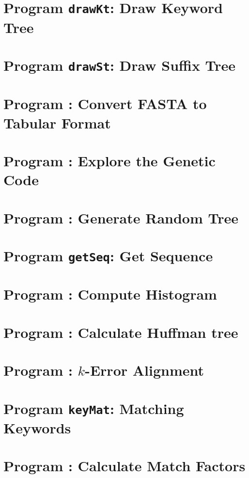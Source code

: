 \documentclass[a4paper]{report}
\begin{document}
\chapter{Program \texttt{drawKt}: Draw Keyword Tree}\label{ch:dkt}

\chapter{Program \texttt{drawSt}: Draw Suffix Tree}\label{ch:dst}

\chapter{Program : Convert FASTA to Tabular
  Format}\label{ch:f2t}

\chapter{Program : Explore the Genetic Code}\label{ch:gc}

\chapter{Program : Generate Random Tree}\label{ch:gt}

\chapter{Program \texttt{getSeq}: Get Sequence}\label{ch:get}

\chapter{Program : Compute Histogram}\label{ch:his}

\chapter{Program : Calculate Huffman tree}\label{ch:hut}

\chapter{Program : $k$-Error Alignment}\label{ch:ke}

\chapter{Program \texttt{keyMat}: Matching Keywords}\label{ch:km}

\chapter{Program : Calculate Match Factors}\label{ch:ma}

\end{document}
